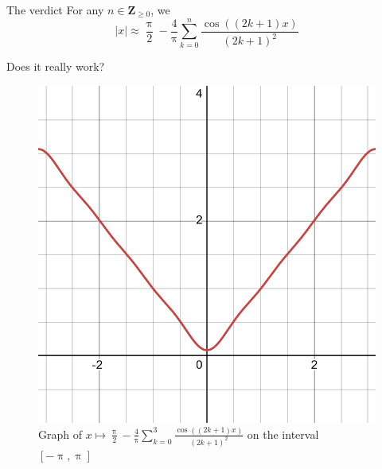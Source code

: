 \documentclass[portrait,fleqn,12pt]{beamer}
\newcommand{\integers}{\mathbf{Z}}
\begin{document}
\begin{frame}{The verdict}
  For any $n \in \integers_{\geq 0}$, we
  \begin{equation}
    |x| \approx \frac{\uppi}{2} 
       - \frac{4}{\uppi}
         \sum_{k=0}^n \frac{\cos((2 k+1) x)}{(2k+1)^2}
  \end{equation}
\end{frame}

\begin{frame}{Does it really work?}
  \begin{center}
    \begin{figure}
  \includegraphics[scale=0.15]{desmos-graph(21).png}
  \caption{Graph of $x\mapsto \frac{\uppi}{2} 
  - \frac{4}{\uppi}
    \sum_{k=0}^3 \frac{\cos((2 k+1) x)}{(2k+1)^2}$
    on the interval $[-\uppi, \uppi]$}
    \end{figure}
  \end{center}
\end{frame}
\end{document}
